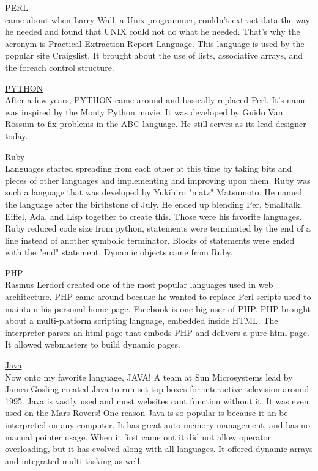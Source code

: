 \documentclass[letterpaper, 10 pt, conference]{IEEEtran}
\begin{document}
\noindent \underline{PERL}\\
came about when Larry Wall, a Unix programmer, couldn't extract data the way he needed and found that UNIX could not do what he needed. That's why the acronym is Practical Extraction Report Language. This language is used by the popular site Craigslist. It brought about the use of lists, associative arrays, and the foreach control structure. \bigskip

\noindent \underline{PYTHON}\\
After a few years, PYTHON came around and basically replaced Perl. It's name was inspired by the Monty Python movie. It was developed by Guido Van Rossum to fix problems in the ABC language. He still serves as its lead designer today. \bigskip

\noindent \underline{Ruby}\\
Languages started spreading from each other at this time by taking bits and pieces of other languages and implementing and improving upon them. Ruby was such a language that was developed by Yukihiro "matz" Matsumoto. He named the language after the birthstone of July. He ended up blending Per, Smalltalk, Eiffel, Ada, and Lisp together to create this. Those were his favorite languages. Ruby reduced code size from python, statements were terminated by the end of a line instead of another symbolic terminator. Blocks of statements were ended with the "end" statement. Dynamic objects came from Ruby. \bigskip

\noindent \underline{PHP}\\
Rasmus Lerdorf created one of the most popular languages used in web architecture. PHP came around because he wanted to replace Perl scripts used to maintain his personal home page. Facebook is one big user of PHP. PHP brought about a multi-platform scripting language, embedded inside HTML. The interpreter parses an html page that embeds PHP and delivers a pure html page. It allowed webmasters to build dynamic pages. \bigskip

\noindent \underline{Java}\\
Now onto my favorite language, JAVA! A team at Sun Microsystems lead by James Gosling created Java to run set top boxes for interactive television around 1995. Java is vastly used and most websites cant function without it. It was even used on the Mars Rovers! One reason Java is so popular is because it an be interpreted on any computer. It has great auto memory management, and has no manual pointer usage. When it first came out it did not allow operator overloading, but it has evolved along with all languages. It offered dynamic arrays and integrated multi-tasking as well. \bigskip
\end{document}
